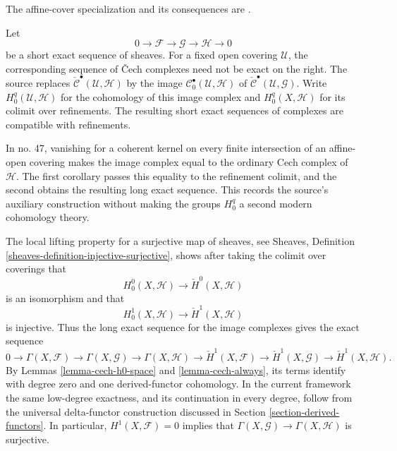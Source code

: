 \begin{remark}
\label{remark-FAC-cech-low-degree-exact-sequence}
\begin{reference}
\cite[Chapter I, \S 3, no. 24, Propositions 5 and 6 and
Corollaries 1 and 2, pp. 216--217]{FAC}
The affine-cover specialization and its consequences are
\cite[Chapter II, \S 3, no. 47, Theorem 5 and Corollaries 1 and 2,
pp. 239--240]{FAC}.
\end{reference}
Let
$$
0 \to \mathcal{F} \to \mathcal{G} \to \mathcal{H} \to 0
$$
be a short exact sequence of sheaves. For a fixed open covering
$\mathcal{U}$, the corresponding sequence of {\v C}ech complexes need
not be exact on the right. The source replaces
$\check{\mathcal{C}}^\bullet(\mathcal{U}, \mathcal{H})$ by the image
$\mathcal{C}_0^\bullet(\mathcal{U}, \mathcal{H})$ of
$\check{\mathcal{C}}^\bullet(\mathcal{U}, \mathcal{G})$. Write
$H_0^q(\mathcal{U}, \mathcal{H})$ for the cohomology of this image
complex and $H_0^q(X, \mathcal{H})$ for its colimit over refinements.
The resulting short exact sequences of complexes are compatible with
refinements.

In no. 47, vanishing for a coherent kernel on every finite intersection of
an affine-open covering makes the image complex equal to the ordinary Cech
complex of $\mathcal{H}$. The first corollary passes this equality to the
refinement colimit, and the second obtains the resulting long exact sequence.
This records the source's auxiliary construction without making the groups
$H_0^q$ a second modern cohomology theory.

The local lifting property for a surjective map of sheaves, see
Sheaves, Definition \ref{sheaves-definition-injective-surjective},
shows after taking the colimit over coverings that
$$
H_0^0(X, \mathcal{H}) \longrightarrow \check{H}^0(X, \mathcal{H})
$$
is an isomorphism and that
$$
H_0^1(X, \mathcal{H}) \longrightarrow \check{H}^1(X, \mathcal{H})
$$
is injective.
Thus the long exact sequence for the image complexes gives the exact
sequence
$$
0 \to \Gamma(X, \mathcal{F}) \to \Gamma(X, \mathcal{G}) \to
\Gamma(X, \mathcal{H}) \to \check{H}^1(X, \mathcal{F}) \to
\check{H}^1(X, \mathcal{G}) \to \check{H}^1(X, \mathcal{H}).
$$
By Lemmas \ref{lemma-cech-h0-space} and \ref{lemma-cech-always}, its terms
identify with degree zero and one derived-functor cohomology. In the current
framework the same low-degree exactness, and its continuation in every
degree, follow from the universal delta-functor construction discussed in
Section \ref{section-derived-functors}. In particular,
$H^1(X, \mathcal{F}) = 0$ implies that
$\Gamma(X, \mathcal{G}) \to \Gamma(X, \mathcal{H})$ is surjective.
\end{remark}

